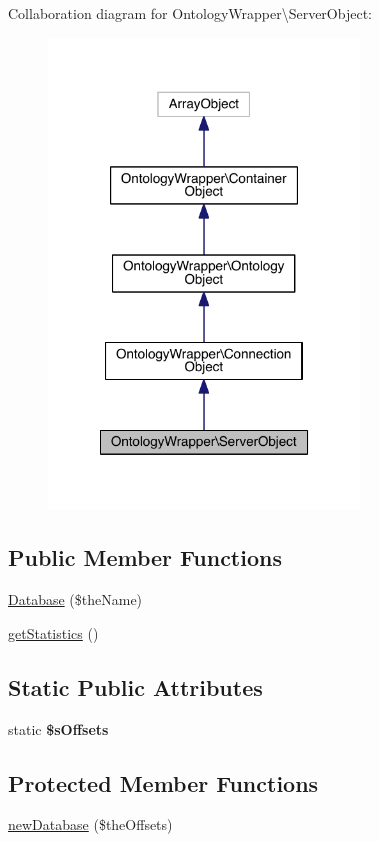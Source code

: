 Collaboration diagram for Ontology\-Wrapper\textbackslash{}Server\-Object\-:\nopagebreak
\begin{figure}[H]
\begin{center}
\leavevmode
\includegraphics[width=234pt]{class_ontology_wrapper_1_1_server_object__coll__graph}
\end{center}
\end{figure}
\subsection*{Public Member Functions}
\begin{DoxyCompactItemize}
\item 
\hyperlink{class_ontology_wrapper_1_1_server_object_a3ce047db243e208640e8eaf89b986c7a}{Database} (\$the\-Name)
\item 
\hyperlink{class_ontology_wrapper_1_1_server_object_afdff50c16982e3266578d75d1fb19dea}{get\-Statistics} ()
\end{DoxyCompactItemize}
\subsection*{Static Public Attributes}
\begin{DoxyCompactItemize}
\item 
static {\bfseries \$s\-Offsets}
\end{DoxyCompactItemize}
\subsection*{Protected Member Functions}
\begin{DoxyCompactItemize}
\item 
\hyperlink{class_ontology_wrapper_1_1_server_object_a0ba24c5513d7b5dc168a0d058adb2aca}{new\-Database} (\$the\-Offsets)
\end{DoxyCompactItemize}
